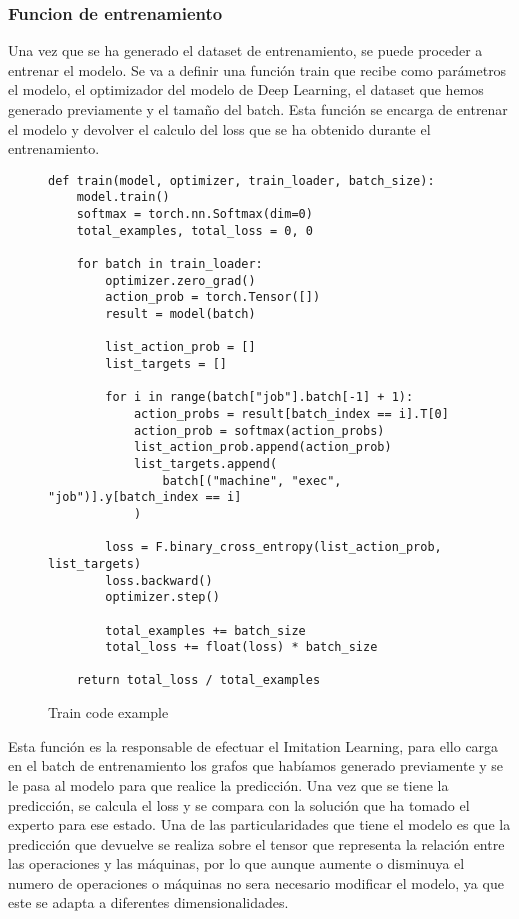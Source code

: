 \subsubsection{Funcion de entrenamiento}
Una vez que se ha generado el dataset de entrenamiento, se puede proceder a entrenar el modelo.
Se va a definir una función train que recibe como parámetros el modelo, el optimizador del modelo
de Deep Learning, el dataset
que hemos generado previamente y el tamaño del batch. Esta función se encarga de entrenar el modelo
y devolver el calculo del loss que se ha obtenido durante el entrenamiento.\medskip

\begin{figure}[ht]
\begin{lstlisting}
def train(model, optimizer, train_loader, batch_size):
    model.train()
    softmax = torch.nn.Softmax(dim=0)
    total_examples, total_loss = 0, 0

    for batch in train_loader:
        optimizer.zero_grad()
        action_prob = torch.Tensor([])
        result = model(batch)

        list_action_prob = []
        list_targets = []

        for i in range(batch["job"].batch[-1] + 1):
            action_probs = result[batch_index == i].T[0]
            action_prob = softmax(action_probs)
            list_action_prob.append(action_prob)
            list_targets.append(
                batch[("machine", "exec", "job")].y[batch_index == i]
            )

        loss = F.binary_cross_entropy(list_action_prob, list_targets)
        loss.backward()
        optimizer.step()

        total_examples += batch_size
        total_loss += float(loss) * batch_size

    return total_loss / total_examples 
\end{lstlisting}\medskip
    \caption{Train code example}
    \label{fig:traincode}
\end{figure}

Esta función es la responsable de efectuar el Imitation Learning, para ello carga en el
batch de entrenamiento los grafos que habíamos generado previamente y se le pasa al modelo para que
realice la predicción. Una vez que se tiene la predicción, se calcula el loss y se compara
con la solución que ha tomado el experto para ese estado. Una de las particularidades que
tiene el modelo es que la predicción que devuelve se realiza sobre el tensor que representa
la relación entre las operaciones y las máquinas, por lo que aunque aumente o disminuya 
el numero de operaciones o máquinas no sera necesario modificar el modelo, ya que este 
se adapta a diferentes dimensionalidades.

